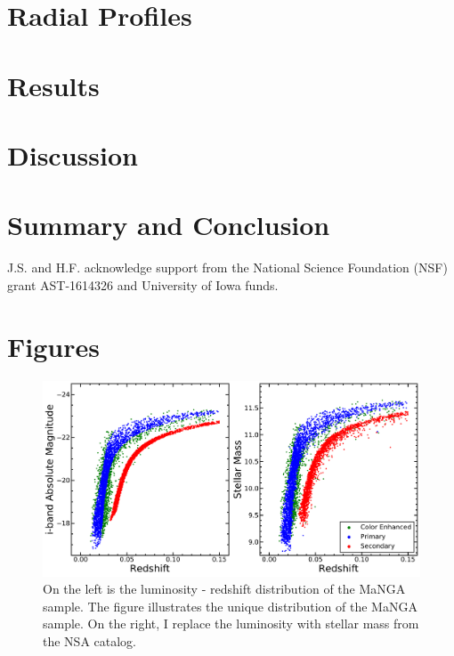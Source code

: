 \documentclass[iop,revtex4,twocolumn,apj,numberedappendix,appendixfloats]{emulateapj}
\begin{document}
\section{Radial Profiles}\label{sec:radial}


\section{Results}\label{sec:results}


\section{Discussion}\label{sec:discussion}


\section{Summary and Conclusion}\label{sec:sum}






\acknowledgments

J.S. and H.F. acknowledge support from the National Science Foundation (NSF) grant AST-1614326 and University of Iowa funds. 





\hbox{}\clearpage

\appendix

\section{Figures}

\begin{figure}
\centering
\includegraphics[width=\linewidth]{fig/Mi-z.pdf}
\caption[The luminosity - redshift distribution and mass - redshift distribution of the MaNGA sample.]{On the left is the luminosity - redshift distribution of the MaNGA sample. The figure illustrates the unique distribution of the MaNGA sample. On the right, I replace the luminosity with stellar mass from the NSA catalog.}
\label{fig:Mi-z}
\end{figure}
\end{document}
